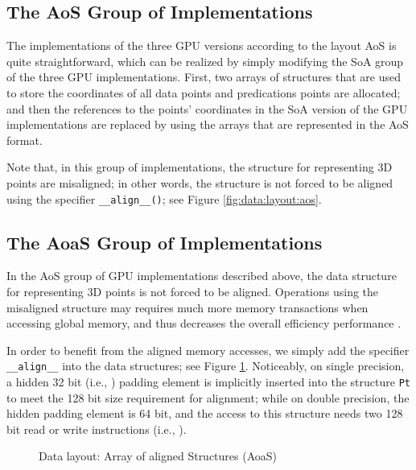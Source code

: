 \subsection{The AoS Group of Implementations}
\label{sec:implement:aos}

The implementations of the three GPU versions according to the layout AoS is 
quite straightforward, which can be realized by simply modifying the SoA 
group of the three GPU implementations. First, two arrays of structures 
that are used to store the coordinates of all data points and predications 
points are allocated; and then the references to the points' coordinates in 
the SoA version of the GPU implementations are replaced by using the arrays 
that are represented in the AoS format. 

Note that, in this group of implementations, the structure for 
representing 3D points are misaligned; in other words, the structure is 
not forced to be aligned using the specifier \texttt{{\_}{\_}align{\_}{\_}()}; see 
Figure \ref{fig:data:layout:aos}.


\subsection{The AoaS Group of Implementations}
\label{sec:implement:aoas}

In the AoS group of GPU implementations described above, the data structure for representing 3D 
points is not forced to be aligned. Operations using the misaligned 
structure may requires much more memory transactions when accessing global 
memory, and thus decreases the overall efficiency performance \cite{cuda2013}.

In order to benefit from the aligned memory accesses, we simply add the 
specifier \texttt{{\_}{\_}align{\_}{\_}} into the data structures; see Figure \ref{fig:layout:aoas}. 
Noticeably, on single precision, a hidden 32 bit (i.e., ) 
padding element is implicitly inserted into the structure \texttt{Pt} to meet the 128 
bit size requirement for alignment; while on double precision, the hidden 
padding element is 64 bit, and the access to this structure needs two 128 
bit read or write instructions (i.e., ). 

\begin{figure}[htb]
    \centering
    \caption{Data layout: Array of aligned Structures (AoaS)}
    \label{fig:layout:aoas}       \end{figure}

